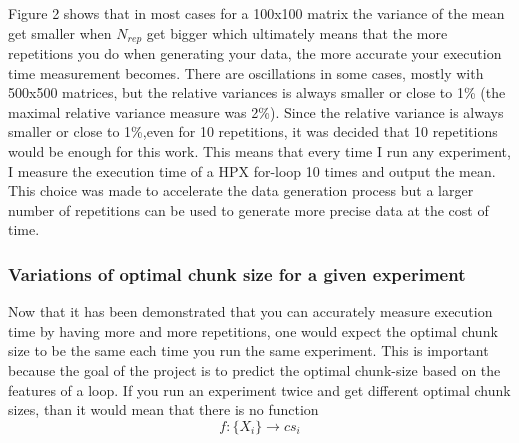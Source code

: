 \newpage
Figure 2 shows that in most cases for a 100x100 matrix the variance of the mean get smaller when $N_{rep}$ get bigger which ultimately means that the more repetitions you do when generating your data, the more accurate your execution time measurement becomes. There are oscillations in some cases, mostly with 500x500 matrices, but the relative variances is always smaller or close to 1\% (the maximal relative variance measure was 2\%). Since the relative variance is always smaller or close to 1\%,even for 10 repetitions, it was decided that 10 repetitions would be enough for this work. This means that every time I run any experiment, I measure the execution time of a HPX for-loop 10 times and output the mean. This choice was made to accelerate the data generation process but a larger number of repetitions can be used to generate more precise data at the cost of time.

\subsubsection{Variations of optimal chunk size for a given experiment}

Now that it has been demonstrated that you can accurately measure execution time by having more and more repetitions, one would expect the optimal chunk size to be the same each time you run the same experiment. This is important because the goal of the project is to predict the optimal chunk-size based on the features of a loop. If you run an experiment twice and get different optimal chunk sizes, than it would mean that there is no function $$f:\{X_i\} \rightarrow cs_i$$ 

